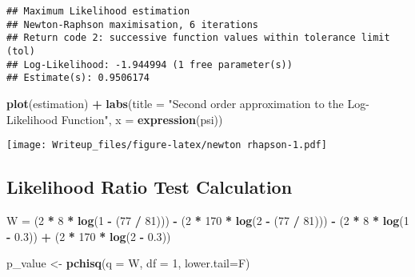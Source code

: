 \documentclass[
  11pt,
]{article}
\newenvironment{Shaded}{\begin{snugshade}}{\end{snugshade}}
\newcommand{\AttributeTok}[1]{\textcolor[rgb]{0.13,0.29,0.53}{#1}}
\newcommand{\DecValTok}[1]{\textcolor[rgb]{0.00,0.00,0.81}{#1}}
\newcommand{\FloatTok}[1]{\textcolor[rgb]{0.00,0.00,0.81}{#1}}
\newcommand{\FunctionTok}[1]{\textcolor[rgb]{0.13,0.29,0.53}{\textbf{#1}}}
\newcommand{\NormalTok}[1]{#1}
\newcommand{\OtherTok}[1]{\textcolor[rgb]{0.56,0.35,0.01}{#1}}
\newcommand{\SpecialCharTok}[1]{\textcolor[rgb]{0.81,0.36,0.00}{\textbf{#1}}}
\newcommand{\StringTok}[1]{\textcolor[rgb]{0.31,0.60,0.02}{#1}}
\begin{document}
\begin{verbatim}
## Maximum Likelihood estimation
## Newton-Raphson maximisation, 6 iterations
## Return code 2: successive function values within tolerance limit (tol)
## Log-Likelihood: -1.944994 (1 free parameter(s))
## Estimate(s): 0.9506174
\end{verbatim}

\begin{Shaded}
\begin{Highlighting}[]
\FunctionTok{plot}\NormalTok{(estimation) }\SpecialCharTok{+}
    \FunctionTok{labs}\NormalTok{(}\AttributeTok{title =} \StringTok{"Second order approximation to the Log{-}Likelihood Function"}\NormalTok{, }
         \AttributeTok{x =} \FunctionTok{expression}\NormalTok{(psi))}
\end{Highlighting}
\end{Shaded}

\texttt{[image: Writeup\_files/figure-latex/newton rhapson-1.pdf]}

\hypertarget{likelihood-ratio-test-calculation}{%
\subsection{Likelihood Ratio Test
Calculation}\label{likelihood-ratio-test-calculation}}

\begin{Shaded}
\begin{Highlighting}[]
\NormalTok{W }\OtherTok{=}\NormalTok{ (}\DecValTok{2} \SpecialCharTok{*} \DecValTok{8} \SpecialCharTok{*} \FunctionTok{log}\NormalTok{(}\DecValTok{1} \SpecialCharTok{{-}}\NormalTok{ (}\DecValTok{77} \SpecialCharTok{/} \DecValTok{81}\NormalTok{))) }\SpecialCharTok{{-}}\NormalTok{ (}\DecValTok{2} \SpecialCharTok{*} \DecValTok{170} \SpecialCharTok{*} \FunctionTok{log}\NormalTok{(}\DecValTok{2} \SpecialCharTok{{-}}\NormalTok{ (}\DecValTok{77} \SpecialCharTok{/} \DecValTok{81}\NormalTok{))) }\SpecialCharTok{{-}}
\NormalTok{    (}\DecValTok{2} \SpecialCharTok{*} \DecValTok{8} \SpecialCharTok{*} \FunctionTok{log}\NormalTok{(}\DecValTok{1} \SpecialCharTok{{-}} \FloatTok{0.3}\NormalTok{)) }\SpecialCharTok{+}\NormalTok{ (}\DecValTok{2} \SpecialCharTok{*} \DecValTok{170} \SpecialCharTok{*} \FunctionTok{log}\NormalTok{(}\DecValTok{2} \SpecialCharTok{{-}} \FloatTok{0.3}\NormalTok{))}

\NormalTok{p\_value }\OtherTok{\textless{}{-}} \FunctionTok{pchisq}\NormalTok{(}\AttributeTok{q =}\NormalTok{ W, }\AttributeTok{df =} \DecValTok{1}\NormalTok{, }\AttributeTok{lower.tail=}\NormalTok{F)}
\end{Highlighting}
\end{Shaded}
\end{document}
